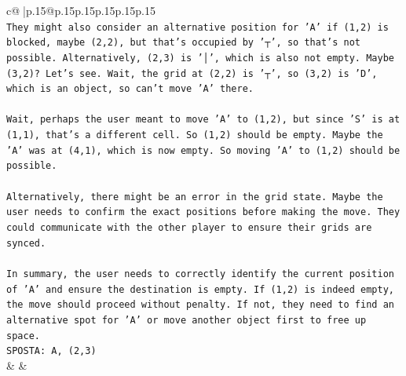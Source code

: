 \documentclass{article}
\begin{document}
{\begin{supertabular}{c@{$\;$}|p{.15\linewidth}@{}p{.15\linewidth}p{.15\linewidth}p{.15\linewidth}p{.15\linewidth}p{.15\linewidth}}
{{{\\ 
\texttt{They might also consider an alternative position for 'A' if (1,2) is blocked, maybe (2,2), but that's occupied by '┬', so that's not possible. Alternatively, (2,3) is '│', which is also not empty. Maybe (3,2)? Let's see. Wait, the grid at (2,2) is '┬', so (3,2) is 'D', which is an object, so can't move 'A' there.} \\
\\ 
\texttt{Wait, perhaps the user meant to move 'A' to (1,2), but since 'S' is at (1,1), that's a different cell. So (1,2) should be empty. Maybe the 'A' was at (4,1), which is now empty. So moving 'A' to (1,2) should be possible.} \\
\\ 
\texttt{Alternatively, there might be an error in the grid state. Maybe the user needs to confirm the exact positions before making the move. They could communicate with the other player to ensure their grids are synced.} \\
\\ 
\texttt{In summary, the user needs to correctly identify the current position of 'A' and ensure the destination is empty. If (1,2) is indeed empty, the move should proceed without penalty. If not, they need to find an alternative spot for 'A' or move another object first to free up space.} \\
\texttt{SPOSTA: A, (2,3)} \\
            }
        }
    }
    & & \\ \\


\end{supertabular}}
\end{document}
